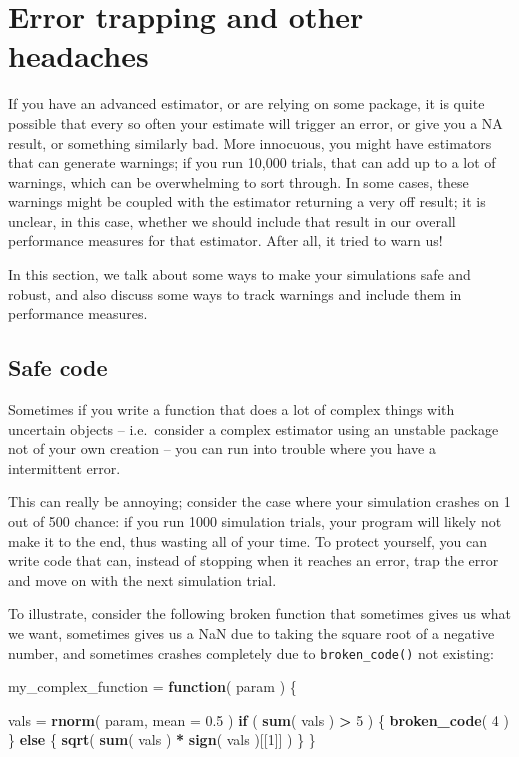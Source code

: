 \documentclass[
]{book}
\newenvironment{Shaded}{\begin{snugshade}}{\end{snugshade}}
\newcommand{\AttributeTok}[1]{\textcolor[rgb]{0.13,0.29,0.53}{#1}}
\newcommand{\ControlFlowTok}[1]{\textcolor[rgb]{0.13,0.29,0.53}{\textbf{#1}}}
\newcommand{\DecValTok}[1]{\textcolor[rgb]{0.00,0.00,0.81}{#1}}
\newcommand{\FloatTok}[1]{\textcolor[rgb]{0.00,0.00,0.81}{#1}}
\newcommand{\FunctionTok}[1]{\textcolor[rgb]{0.13,0.29,0.53}{\textbf{#1}}}
\newcommand{\NormalTok}[1]{#1}
\newcommand{\OtherTok}[1]{\textcolor[rgb]{0.56,0.35,0.01}{#1}}
\newcommand{\SpecialCharTok}[1]{\textcolor[rgb]{0.81,0.36,0.00}{\textbf{#1}}}
\begin{document}
\chapter{Error trapping and other headaches}\label{error-trapping-and-other-headaches}

If you have an advanced estimator, or are relying on some package, it is quite possible that every so often your estimate will trigger an error, or give you a NA result, or something similarly bad.
More innocuous, you might have estimators that can generate warnings; if you run 10,000 trials, that can add up to a lot of warnings, which can be overwhelming to sort through.
In some cases, these warnings might be coupled with the estimator returning a very off result; it is unclear, in this case, whether we should include that result in our overall performance measures for that estimator.
After all, it tried to warn us!

In this section, we talk about some ways to make your simulations safe and robust, and also discuss some ways to track warnings and include them in performance measures.

\section{Safe code}\label{safe_code}

Sometimes if you write a function that does a lot of complex things with
uncertain objects -- i.e.~consider a complex estimator using an unstable package not of your own creation -- you can run into trouble where you have a intermittent error.

This can really be annoying; consider the case where your simulation crashes on 1 out of 500 chance: if you run 1000 simulation trials, your program will likely not make it to the end, thus wasting all of your time.
To protect yourself, you can write code that can, instead of stopping when it reaches an error, trap the error and move on with the next simulation trial.

To illustrate, consider the following broken function that sometimes gives us what we want, sometimes gives us a NaN due to taking the square root of a negative number, and sometimes crashes completely due to \texttt{broken\_code()} not existing:

\begin{Shaded}
\begin{Highlighting}[]
\NormalTok{my\_complex\_function }\OtherTok{=} \ControlFlowTok{function}\NormalTok{( param ) \{}
    
\NormalTok{    vals }\OtherTok{=} \FunctionTok{rnorm}\NormalTok{( param, }\AttributeTok{mean =} \FloatTok{0.5}\NormalTok{ )}
    \ControlFlowTok{if}\NormalTok{ ( }\FunctionTok{sum}\NormalTok{( vals ) }\SpecialCharTok{\textgreater{}} \DecValTok{5}\NormalTok{ ) \{}
        \FunctionTok{broken\_code}\NormalTok{( }\DecValTok{4}\NormalTok{ )}
\NormalTok{    \} }\ControlFlowTok{else}\NormalTok{ \{}
        \FunctionTok{sqrt}\NormalTok{( }\FunctionTok{sum}\NormalTok{( vals ) }\SpecialCharTok{*} \FunctionTok{sign}\NormalTok{( vals )[[}\DecValTok{1}\NormalTok{]] )}
\NormalTok{    \}}
\NormalTok{\}}
\end{Highlighting}
\end{Shaded}
\end{document}
